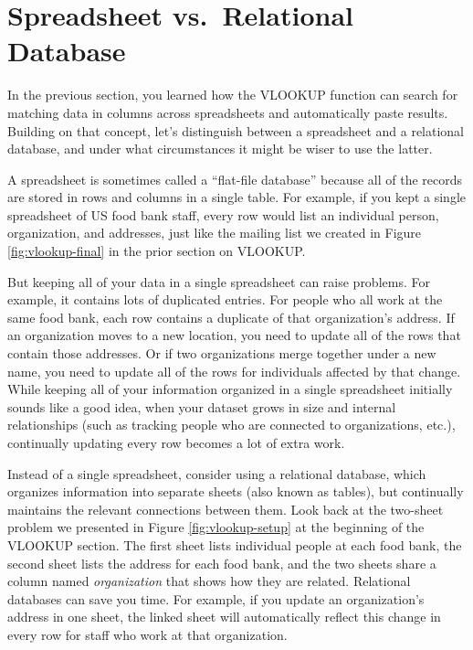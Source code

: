 \documentclass[
  english,
]{book}
\begin{document}
\hypertarget{database}{%
\section*{Spreadsheet vs.~Relational Database}\label{database}}

In the previous section, you learned how the VLOOKUP function can search for matching data in columns across spreadsheets and automatically paste results. Building on that concept, let's distinguish between a spreadsheet and a relational database, and under what circumstances it might be wiser to use the latter.

A spreadsheet is sometimes called a ``flat-file database'' because all of the records are stored in rows and columns in a single table. For example, if you kept a single spreadsheet of US food bank staff, every row would list an individual person, organization, and addresses, just like the mailing list we created in Figure \ref{fig:vlookup-final} in the prior section on VLOOKUP.

But keeping all of your data in a single spreadsheet can raise problems. For example, it contains lots of duplicated entries. For people who all work at the same food bank, each row contains a duplicate of that organization's address. If an organization moves to a new location, you need to update all of the rows that contain those addresses. Or if two organizations merge together under a new name, you need to update all of the rows for individuals affected by that change. While keeping all of your information organized in a single spreadsheet initially sounds like a good idea, when your dataset grows in size and internal relationships (such as tracking people who are connected to organizations, etc.), continually updating every row becomes a lot of extra work.

Instead of a single spreadsheet, consider using a relational database, which organizes information into separate sheets (also known as tables), but continually maintains the relevant connections between them. Look back at the two-sheet problem we presented in Figure \ref{fig:vlookup-setup} at the beginning of the VLOOKUP section. The first sheet lists individual people at each food bank, the second sheet lists the address for each food bank, and the two sheets share a column named \emph{organization} that shows how they are related. Relational databases can save you time. For example, if you update an organization's address in one sheet, the linked sheet will automatically reflect this change in every row for staff who work at that organization.
\end{document}
